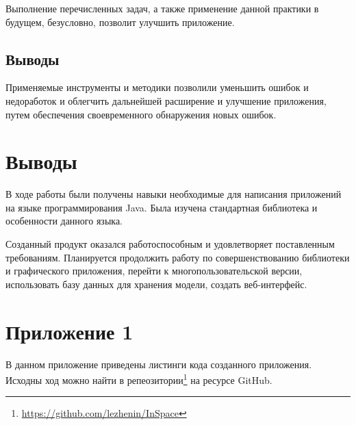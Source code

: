 Выполнение перечисленных задач, а также применение данной практики в будущем, безусловно, позволит улучшить приложение.

\subsection{Выводы}
Применяемые инструменты и методики позволили уменьшить ошибок и недоработок и облегчить дальнейшей расширение и улучшение приложения, путем обеспечения своевременного обнаружения новых ошибок. 

\section{Выводы}
В ходе работы были получены навыки необходимые для написания приложений на языке программирования Java. Была изучена стандартная библиотека и особенности данного языка.

Созданный продукт оказался работоспособным и удовлетворяет поставленным требованиям. Планируется продолжить работу по совершенствованию библиотеки и графического приложения, перейти к многопользовательской версии, использовать базу данных для хранения модели, создать веб-интерфейс.

\section{Приложение 1}
\label{sec:listings}

В данном приложение приведены листинги кода созданного приложения. Исходны ход можно найти в репеозитории\footnote{\url{https://github.com/lezhenin/InSpace}} на ресурсе GitHub.

\label{listing:Galaxy} 

\parindent=0.6cm


\label{listing:Planet} 

\parindent=0.6cm


\label{listing:Position} 

\parindent=0.6cm


\label{listing:Building} 

\parindent=0.6cm


